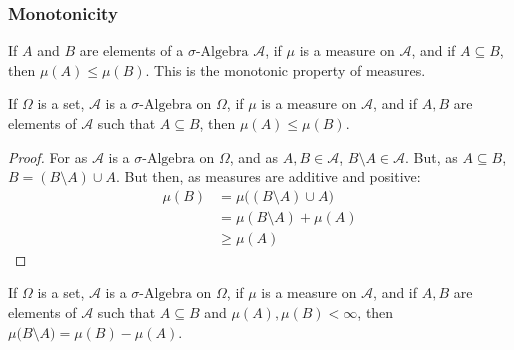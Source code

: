                 \subsubsection{Monotonicity}
                    If $A$ and $B$ are elements of a $\sigma\text{-Algebra}$
                    $\mathcal{A}$, if $\mu$ is a measure on
                    $\mathcal{A}$, and if $A\subseteq{B}$, then
                    $\mu(A)\leq\mu(B)$. This is the monotonic property
                    of measures.
                    \begin{theorem}
                        If $\Omega$ is a set, $\mathcal{A}$ is a
                        $\sigma\text{-Algebra}$ on $\Omega$, if
                        $\mu$ is a measure on $\mathcal{A}$, and if
                        $A,B$ are elements of $\mathcal{A}$ such that
                        $A\subseteq{B}$, then $\mu(A)\leq\mu(B)$.
                    \end{theorem}
                    \begin{proof}
                        For as $\mathcal{A}$ is a $\sigma\text{-Algebra}$
                        on $\Omega$, and as $A,B\in\mathcal{A}$,
                        $B\setminus{A}\in\mathcal{A}$. But, as
                        $A\subseteq{B}$, $B=(B\setminus{A})\cup{A}$.
                        But then, as measures are additive and positive:
                        \begin{align}
                            \mu(B)&=\mu\big((B\setminus{A})\cup{A}\big)\\
                            &=\mu(B\setminus{A})+\mu(A)\\
                            &\geq\mu(A)
                        \end{align}
                    \end{proof}
                    \begin{theorem}
                        If $\Omega$ is a set, $\mathcal{A}$ is a
                        $\sigma\text{-Algebra}$ on $\Omega$, if
                        $\mu$ is a measure on $\mathcal{A}$, and if
                        $A,B$ are elements of $\mathcal{A}$ such that
                        $A\subseteq{B}$ and $\mu(A),\mu(B)<\infty$,
                        then $\mu\big(B\setminus{A}\big)=\mu(B)-\mu(A)$.
                    \end{theorem}
